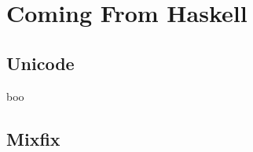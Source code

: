 \documentclass[12pt]{article}
\begin{document}
\tableofcontents{}





\section{Coming From Haskell}
\subsection{Unicode}
boo

\subsection{Mixfix}

\printbibliography{}
\end{document}
